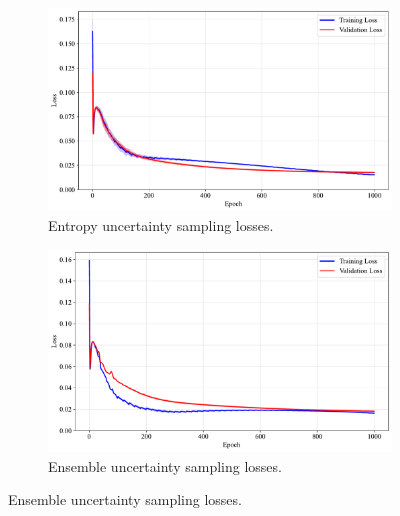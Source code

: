 \documentclass[10pt, conference]{IEEEtran}
\begin{document}
\begin{figure}[!t]
	\begin{subfigure}{\linewidth}
		\centering
		\includegraphics[width=\linewidth]{../results/fashion/us_losses.pdf}
		\caption{Entropy uncertainty sampling losses.}
		\label{fig:us_losses_fashion}
	\end{subfigure}
	
	\vspace{0.1em}
	
	\begin{subfigure}{\linewidth}
		\centering
		\includegraphics[width=\linewidth]{../results/fashion/ensemble_us_losses.pdf}
		\caption{Ensemble uncertainty sampling losses.}
		\label{fig:ensemble_us_losses_fashion}
	\end{subfigure}
\end{figure}
\end{document}
